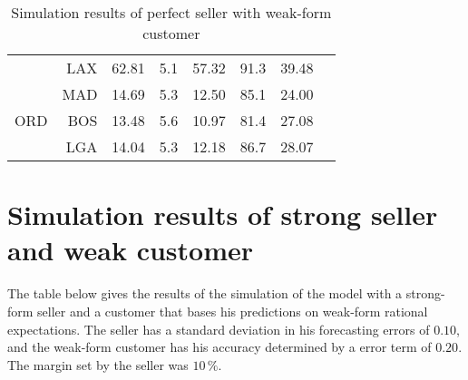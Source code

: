 \begin{table}[h]
\begin{center}
\begin{tabular}{l r c c c c c c}
     &  LAX &   62.81  &     5.1  &   57.32  &    91.3  &   39.48  \\
     &  MAD &   14.69  &     5.3  &   12.50  &    85.1  &   24.00  \\[.5ex]
ORD  &  BOS &   13.48  &     5.6  &   10.97  &    81.4  &   27.08  \\
     &  LGA &   14.04  &     5.3  &   12.18  &    86.7  &   28.07  \\
            \bottomrule
        \end{tabular}
        \caption{Simulation results of perfect seller with weak-form customer}
        \label{tbl:resultsBS}
    \end{center}
\end{table}





\chapter{Simulation results of strong seller and weak customer}
\label{app:SimulationResultsPerfectWeak}
The table below gives the results of the simulation of the model with a strong-form seller and a customer that bases his predictions on weak-form rational expectations. The seller has a standard deviation in his forecasting errors of $0.10$, and the weak-form customer has his accuracy determined by a error term of $0.20$. The margin set by the seller was $10\,\%$.

